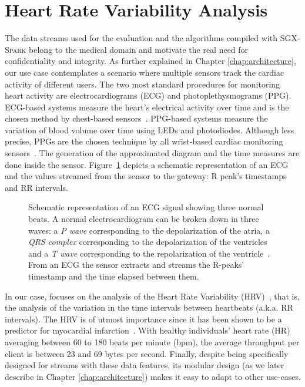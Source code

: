 \section{Heart Rate Variability Analysis} \label{sec:background:med}
The data streams used for the evaluation and the algorithms compiled with \textsc{SGX-Spark} belong to the medical domain and motivate the real need for confidentiality and integrity. 
As further explained in Chapter \ref{chap:architecture}, our use case contemplates a scenario where multiple sensors track the cardiac activity of different users.
The two most standard procedures for monitoring heart activity are electrocardiograms (ECG) and photoplethysmograms (PPG).
ECG-based systems measure the heart's electrical activity over time and is the chosen method by chest-based sensors~\cite{Tamura2018}.
PPG-based systems measure the variation of blood volume over time using LEDs and photodiodes.
Although less precise, PPGs are the chosen technique by all wrist-based cardiac monitoring sensors~\cite{Parak2015}.
The generation of the approximated diagram and the time measures are done inside the sensor.
Figure~\ref{fig:ecg-hrv} depicts a schematic representation of an ECG and the values streamed from the sensor to the gateway: R peak's timestamps and RR intervals. 
\begin{figure}[h!]
    \centering
    
    \caption{Schematic representation of an ECG signal showing three normal beats. A normal electrocardiogram can be broken down in three waves: a \textit{P wave} corresponding to the depolarization of the atria, a \textit{QRS complex} corresponding to the depolarization of the ventricles and a \textit{T wave} corresponding to the repolarization of the ventricle~\cite{Lilly2001}. From an ECG the sensor extracts and streams the R-peaks' timestamp and the time elapsed between them. \label{fig:ecg-hrv}}
\end{figure}

In our case, \projName focuses on the analysis of the Heart Rate Variability (HRV)~\cite{Camm1996}, that is, the analysis of the variation in the time intervals between heartbeats (a.k.a. RR intervals).
The HRV is of utmost importance since it has been shown to be a predictor for myocardial infarction~\cite{Kleiger1987,Bigger1992}.
With healthy individuals' heart rate (HR) averaging between 60 to 180 beats per minute (bpm), the average throughput per client is between 23 and 69 bytes per second.
Finally, despite \projName being specifically designed for streams with these data features, its modular design (as we later describe in Chapter \ref{chap:architecture}) makes it easy to adapt to other use-cases.
